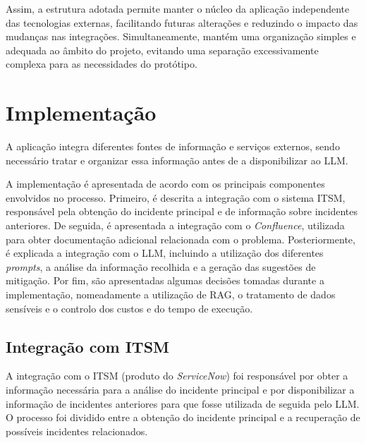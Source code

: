 	Assim, a estrutura adotada permite manter o núcleo da aplicação independente das tecnologias externas, facilitando futuras alterações e reduzindo o impacto das mudanças nas integrações. Simultaneamente, mantém uma organização simples e adequada ao âmbito do projeto, evitando uma separação excessivamente complexa para as necessidades do protótipo.
	
\section{Implementação}

	A aplicação integra diferentes fontes de informação e serviços externos, sendo necessário tratar e organizar essa informação antes de a disponibilizar ao \gls{LLM}. 
	
	A implementação é apresentada de acordo com os principais componentes envolvidos no processo. Primeiro, é descrita a integração com o sistema \gls{ITSM}, responsável pela obtenção do incidente principal e de informação sobre incidentes anteriores. De seguida, é apresentada a integração com o \textit{Confluence}, utilizada para obter documentação adicional relacionada com o problema. Posteriormente, é explicada a integração com o \gls{LLM}, incluindo a utilização dos diferentes \textit{prompts}, a análise da informação recolhida e a geração das sugestões de mitigação. Por fim, são apresentadas algumas decisões tomadas durante a implementação, nomeadamente a utilização de \gls{RAG}, o tratamento de dados sensíveis e o controlo dos custos e do tempo de execução.
	
	\subsection{Integração com ITSM}
		
		A integração com o \gls{ITSM} (produto do \textit{ServiceNow}) foi responsável por obter a informação necessária para a análise do incidente principal e por disponibilizar a informação de incidentes anteriores para que fosse utilizada de seguida pelo \gls{LLM}. O processo foi dividido entre a obtenção do incidente principal e a recuperação de possíveis incidentes relacionados.
		
		
